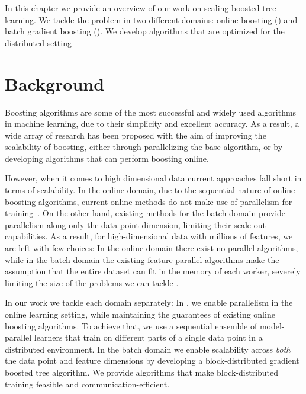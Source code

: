 
In this chapter we provide an overview of our work on scaling boosted tree
learning. We tackle the problem in two different domains: online boosting
(\boostvht) and batch gradient boosting (\blockgbt). We develop algorithms
that are optimized for the distributed setting 

\section{Background}
\label{sec:boostvht-background}

Boosting algorithms are some of the most successful and widely used algorithms
in machine learning, due to their simplicity and excellent accuracy. As a result,
a wide array of research has been proposed with the aim of improving the scalability
of boosting, either through parallelizing the base algorithm, or by developing
algorithms that can perform boosting online.

However, when it comes to high dimensional data current approaches fall short
in terms of scalability.
In the online domain, due to the sequential nature of online boosting algorithms,
current online methods do not make use of parallelism for training~\cite{online-gradient-boosting, Oza2001online, online-boosting-theoretical}.
On the other hand, existing methods for the batch
domain provide parallelism along only the data point dimension, limiting their
scale-out capabilities. As a result, for high-dimensional data with millions
of features, we are left with few choices: In the online domain there exist
no parallel algorithms, while in the batch domain the existing feature-parallel
algorithms make the assumption that the entire dataset can fit in the memory
of each worker, severely limiting the size of the problems we can tackle
\cite{lightgbm, xgboost}.

In our work we tackle each domain separately:
In \boostvht, we enable parallelism in the online learning setting, while maintaining the guarantees of existing
online boosting algorithms. To achieve that, we use a sequential ensemble of model-parallel learners that train
on different parts of a single data point in a distributed environment.
In the batch domain we enable scalability across \emph{both} the data point and
feature dimensions by developing a block-distributed gradient boosted tree algorithm.
We provide algorithms that make block-distributed training feasible and communication-efficient.

